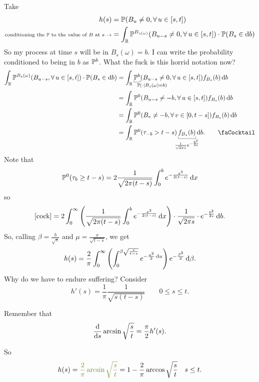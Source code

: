 \documentclass[12pt]{report}
\begin{document}
\begin{fancyproof}
	Take
	\begin{align*}
		h(s)&=\mathbb{P}(B_{u}\neq 0,\forall\, u\in[s,t])\\
		\text{\scriptsize conditioning the $\mathbb{P}$ to the value of $B$ at $s\rightarrow$}&=\int_{\mathbb{R}}\mathbb{P}^{B_{s(\omega)}}(B_{u-s}\neq0,\forall\, u\in[s,t])\cdot\mathbb{P}(B_{s}\in\mathop{}\!\mathrm{d} b)\\
	\end{align*}
	So my process at time $s$ will be in $B_{s}(\omega)=b$. I can write the probability conditioned to being in $b$ as $\mathbb{P}^{b}$. What the fuck is this horrid notation now?
	\begin{align*}
		\int_{\R}\pr^{B_{s}(\omega)}(B_{u-s},\every u\in[s,t])\cdot\pr(B_{s}\in\dif b)&=\int_{\R}\ubracketthin{\pr^{b}}_{\mathrlap{\pr(\cdot\mid B_s(\omega)=b)}}(B_{u-s}\neq0,\every u\in[s,t])f_{B_{s}}(b)\dif b\\
		&=\int_{\R}\pr^{0}(B_{u-s}\neq-b,\every u\in[s,t])f_{B_{s}}(b)\dif b\\
		&=\int_{\R}\pr^{0}(B_{v}\neq-b,\every v\in[0,t-s])f_{B_{s}}(b)\dif b\\
		&=\int_{\R}\pr^{0}(\tau_{-b}>t-s)\ubracketthin{f_{B_{s}}(b)}_{\mathclap{\frac{1}{\sqrt{2\pi s}}e^{-\frac{b^{2}}{2s}}}}\dif b.\tag*{\faCocktail}\label{cock}
	\end{align*}
	Note that
	\begin{equation*}
		\mathbb{P}^{0}(\tau_{b}\geq t-s)=2\frac{1}{\sqrt{2\pi(t-s)}}\int_{0}^{b}e^{-\frac{x^{2}}{2(t-s)}}\mathop{}\!\mathrm{d} x
	\end{equation*}
	so
	\begin{equation*}
		\eqref{cock}=2\int_{0}^{\infty}\left(\frac{1}{\sqrt{2\pi(t-s)}}\int_{0}^{b}e^{-\frac{x^{2}}{2(t-s)}}\mathop{}\!\mathrm{d} x\right)\cdot\frac{1}{\sqrt{2\pi s}}\cdot e^{-\frac{b^{2}}{2s}}\mathop{}\!\mathrm{d} b.
	\end{equation*}
	So, calling $\beta=\frac{b}{\sqrt{s}}$ and $\mu=\frac{x}{\sqrt{t-s}}$, we get
	\begin{equation*}
		h(s)=\frac{2}{\pi}\int_{0}^{\infty}\left(\int_{0}^{\beta\sqrt{\frac{s}{t-s}}}e^{-\frac{u^{2}}{2}\mathop{}\!\mathrm{d} u}\right)e^{-\frac{\beta^{2}}{2}}\mathop{}\!\mathrm{d}\beta.
	\end{equation*}
	Why do we have to endure suffering? Consider
	\begin{equation*}
		h'(s)=\frac{1}{\pi}\frac{1}{\sqrt{s(t-s)}}\qquad0\leq s\leq t.
	\end{equation*}
	\begin{revise}
		Remember that 
		\begin{equation*}
			\frac{\mathop{}\!\mathrm{d}}{\mathop{}\!\mathrm{d} s}\arcsin\sqrt{\frac{s}{t}} =\frac{\pi}{2}h'(s).
		\end{equation*}
	\end{revise}
	So
	\begin{equation*}
		h(s)=\mathcolor{OliveDrab4}{\frac{2}{\pi}\arcsin\sqrt{\frac{s}{t}}}=1-\frac{2}{\pi}\arccos\sqrt{\frac{s}{t}}\quad s\leq t.
	\end{equation*}
\end{fancyproof}
\end{document}
